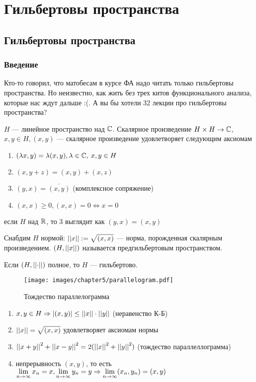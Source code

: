 \documentclass[document]{subfiles}
\begin{document}
\part{Гильбертовы пространства}
\chapter{Гильбертовы пространства}
\section{Введение}
Кто-то говорил, что матобесам в курсе ФА надо читать только гильбертовы пространства. Но неизвестно, как жить без трех китов функционального анализа, которые нас ждут дальше :(. 
А вы бы хотели 32 лекции про гильбертовы пространства?

\begin{definition}
    $H$ --- линейное пространство над $\mathbb{C}$. Скалярное произведение $H \times H \rightarrow \mathbb{C}$, $x,y \in H, (x,y)$ --- скалярное произведение удовлетворяет следующим аксиомам
    \begin{enumerate}
        \item $(\lambda x, y) = \lambda(x,y), \lambda \in \mathbb{C}, \: x,y \in H$ 
        \item $(x, y+z) = (x,y) + (x,z)$
        \item $(y,x) = \overline{(x,y)}$ (комплексное сопряжение) 
        \item $(x,x) \geq 0, (x,x) = 0 \Leftrightarrow x = 0$
    \end{enumerate}
    если $H$ над $\mathbb{R}$, то 3 выглядит как $(y,x) = (x,y)$
\end{definition}

Снабдим $H$ нормой: $\left|\left| {x} \right| \right| := \sqrt{(x,x)}$ --- норма, порожденная скалярным произведением. $(H, \left|\left| {x} \right| \right|)$ называется предгильбертовым пространством.

Если $(H, \left|\left| {\cdot} \right| \right|)$ полное, то $H$ --- гильбертово.

\begin{figure}
    \centering
    \texttt{[image: images/chapter5/parallelogram.pdf]}\caption{Тождество параллелограмма}
\end{figure}

\begin{property}
    \begin{enumerate}
        \item $x,y \in H \Rightarrow |(x,y)| \leq \left|\left| {x} \right| \right| \cdot \left|\left| {y} \right| \right|$ (неравенство К-Б)
        \item $\left|\left| {x} \right| \right| = \sqrt{(x,x)}$ удовлетворяет аксиомам нормы
        \item $\left|\left| {x+y} \right| \right|^2 + \left|\left| {x-y} \right| \right|^2 = 2(\left|\left| {x} \right| \right|^2 + \left|\left| {y} \right| \right|^2)$ (тождество параллеллограмма)
        \item непрерывность $(x,y)$, то есть $\lim\limits_{n \to \infty} x_n = x, \lim\limits_{n \to \infty} y_n = y \Rightarrow \lim\limits_{n \to \infty} (x_n, y_n) = (x,y)$
    \end{enumerate}
\end{property}
\end{document}
